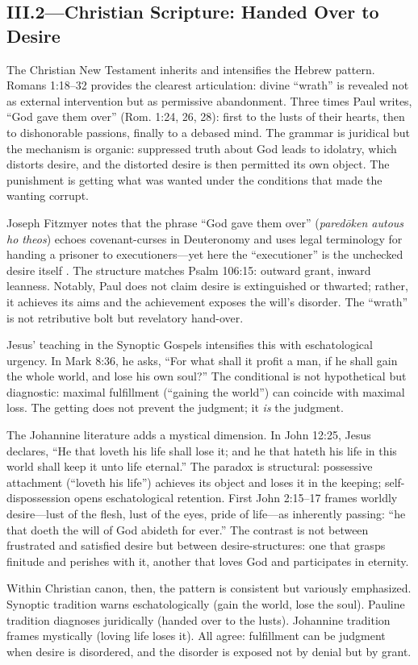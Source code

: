 \subsection*{III.2—Christian Scripture: Handed Over to Desire}
\label{ssec:iii-christian-scripture}

The Christian New Testament inherits and intensifies the Hebrew pattern. Romans 1:18--32
provides
the clearest articulation: divine ``wrath'' is revealed not as external intervention but as
permissive abandonment. Three times Paul writes, ``God gave them over'' (Rom. 1:24, 26, 28):
first to the lusts of their hearts, then to dishonorable passions, finally to a debased mind.
The grammar is juridical but the mechanism is organic: suppressed truth about God leads to
idolatry, which distorts desire, and the distorted desire is then permitted its own object.
The punishment is getting what was wanted under the conditions that made the wanting corrupt.

Joseph Fitzmyer notes that the phrase ``God gave them over'' (\emph{paredōken autous ho theos})
echoes covenant-curses in Deuteronomy and uses legal terminology for handing a prisoner to
executioners---yet here the ``executioner'' is the unchecked desire itself
\parencite{FitzmyerRomans1993}. The structure matches Psalm 106:15: outward grant, inward
leanness. Notably, Paul does not claim desire is extinguished or thwarted; rather, it achieves
its aims and the achievement exposes the will's disorder. The ``wrath'' is not retributive
bolt but revelatory hand-over.

Jesus' teaching in the Synoptic Gospels intensifies this with eschatological urgency. In Mark
8:36, he asks, ``For what shall it profit a man, if he shall gain the whole world, and lose
his own soul?'' The conditional is not hypothetical but diagnostic: maximal fulfillment
(``gaining the world'') can coincide with maximal loss. The getting does not prevent the
judgment; it \emph{is} the judgment.

The Johannine literature adds a mystical dimension. In John 12:25, Jesus declares, ``He that
loveth his life shall lose it; and he that hateth his life in this world shall keep it unto
life eternal.'' The paradox is structural: possessive attachment (``loveth his life'')
achieves its object and loses it in the keeping; self-dispossession opens eschatological
retention. First John 2:15--17 frames worldly desire---lust of the flesh, lust of the eyes,
pride of life---as inherently passing: ``he that doeth the will of God abideth for ever.''
The contrast is not between frustrated and satisfied desire but between desire-structures:
one that grasps
finitude and perishes with it, another that loves God and participates in eternity.

Within Christian canon, then, the pattern is consistent but variously emphasized. Synoptic
tradition warns eschatologically (gain the world, lose the soul). Pauline tradition diagnoses
juridically (handed over to the lusts). Johannine tradition frames mystically (loving life
loses it). All agree: fulfillment can be judgment when desire is disordered, and the disorder
is exposed not by denial but by grant.
